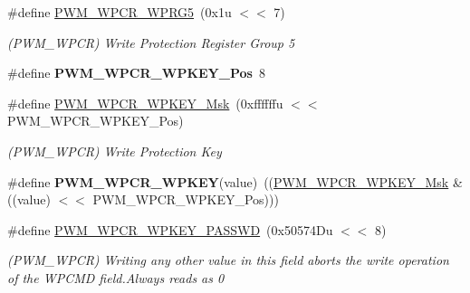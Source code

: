 \begin{DoxyCompactItemize}
\#define \mbox{\hyperlink{group__SAMS70__PWM_gaa3d7f99067043f6c0384045de15cefe2}{P\+W\+M\+\_\+\+W\+P\+C\+R\+\_\+\+W\+P\+R\+G5}}~(0x1u $<$$<$ 7)
\begin{DoxyCompactList}\small\item\em (P\+W\+M\+\_\+\+W\+P\+CR) Write Protection Register Group 5 \end{DoxyCompactList}\item 
\mbox{\label{group__SAMS70__PWM_ga75ecb09b0534c3d7d743fd515061015a}} 
\#define {\bfseries P\+W\+M\+\_\+\+W\+P\+C\+R\+\_\+\+W\+P\+K\+E\+Y\+\_\+\+Pos}~8
\item 
\mbox{\label{group__SAMS70__PWM_gac53d9a5deef4b7978ed39cb2195ceb91}} 
\#define \mbox{\hyperlink{group__SAMS70__PWM_gac53d9a5deef4b7978ed39cb2195ceb91}{P\+W\+M\+\_\+\+W\+P\+C\+R\+\_\+\+W\+P\+K\+E\+Y\+\_\+\+Msk}}~(0xffffffu $<$$<$ P\+W\+M\+\_\+\+W\+P\+C\+R\+\_\+\+W\+P\+K\+E\+Y\+\_\+\+Pos)
\begin{DoxyCompactList}\small\item\em (P\+W\+M\+\_\+\+W\+P\+CR) Write Protection Key \end{DoxyCompactList}\item 
\mbox{\label{group__SAMS70__PWM_ga37888e300dec55b413e04072f650e229}} 
\#define {\bfseries P\+W\+M\+\_\+\+W\+P\+C\+R\+\_\+\+W\+P\+K\+EY}(value)~((\mbox{\hyperlink{group__SAMV71__PWM_gac53d9a5deef4b7978ed39cb2195ceb91}{P\+W\+M\+\_\+\+W\+P\+C\+R\+\_\+\+W\+P\+K\+E\+Y\+\_\+\+Msk}} \& ((value) $<$$<$ P\+W\+M\+\_\+\+W\+P\+C\+R\+\_\+\+W\+P\+K\+E\+Y\+\_\+\+Pos)))
\item 
\mbox{\label{group__SAMS70__PWM_ga4e2631576285918b7f18551b347adaf9}} 
\#define \mbox{\hyperlink{group__SAMS70__PWM_ga4e2631576285918b7f18551b347adaf9}{P\+W\+M\+\_\+\+W\+P\+C\+R\+\_\+\+W\+P\+K\+E\+Y\+\_\+\+P\+A\+S\+S\+WD}}~(0x50574\+Du $<$$<$ 8)
\begin{DoxyCompactList}\small\item\em (P\+W\+M\+\_\+\+W\+P\+CR) Writing any other value in this field aborts the write operation of the W\+P\+C\+MD field.\+Always reads as 0 \end{DoxyCompactList}\item 
\mbox{\label{group__SAMS70__PWM_ga559d91595e9dc987ce9b85428625ec37}} 

\end{DoxyCompactItemize}
